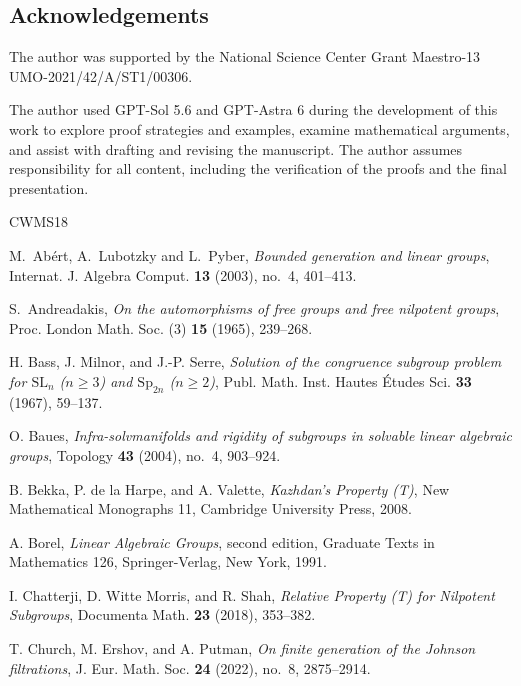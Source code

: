 \documentclass[11pt,a4paper]{article}
\theoremstyle{definition}
\begin{document}
\subsection*{Acknowledgements}
The author was supported by the National Science Center Grant Maestro-13
UMO-2021/42/A/ST1/00306. 


The author used GPT-Sol 5.6 and GPT-Astra 6 during the development of this work to explore proof strategies and examples, examine mathematical arguments, and assist with drafting and revising the manuscript. 
The author assumes responsibility for all content, including the verification of the proofs and the final presentation.


{}
\begin{thebibliography}{CWMS18}
\raggedright

M.~Ab\'ert, A.~Lubotzky and L.~Pyber,
\emph{Bounded generation and linear groups},
Internat. J. Algebra Comput. \textbf{13} (2003), no.~4, 401--413.

S.~Andreadakis, \emph{On the automorphisms of free groups and free
nilpotent groups}, Proc. London Math. Soc. (3) \textbf{15} (1965), 239--268.

H. Bass, J. Milnor, and J.-P. Serre,
\emph{Solution of the congruence subgroup problem for
\(\mathrm{SL}_n\) (\(n\ge3\)) and
\(\mathrm{Sp}_{2n}\) (\(n\ge2\))},
Publ. Math. Inst. Hautes \'Etudes Sci. \textbf{33} (1967), 59--137.

O. Baues, \emph{Infra-solvmanifolds and rigidity of subgroups in
solvable linear algebraic groups}, Topology \textbf{43} (2004),
no.~4, 903--924.

B. Bekka, P. de la Harpe, and A. Valette,
\emph{Kazhdan's Property (T)}, New Mathematical Monographs 11,
Cambridge University Press, 2008.

A. Borel, \emph{Linear Algebraic Groups}, second edition,
Graduate Texts in Mathematics 126, Springer-Verlag, New York, 1991.

I. Chatterji, D. Witte Morris, and R. Shah,
\emph{Relative Property (T) for Nilpotent Subgroups},
Documenta Math. \textbf{23} (2018), 353--382.

T. Church, M. Ershov, and A. Putman,
\emph{On finite generation of the Johnson filtrations},
J. Eur. Math. Soc. \textbf{24} (2022), no.~8, 2875--2914.



\end{thebibliography}
\end{document}
